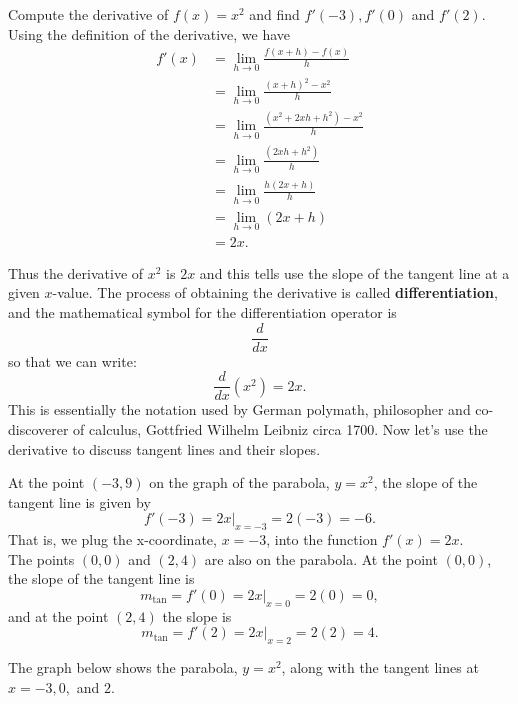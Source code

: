 \documentclass{ximera}
\begin{document}
\begin{example}[example 1]
Compute the derivative of $f(x) = x^2$ and find $f'(-3), f'(0)$ and $f'(2)$.
Using the definition of the derivative, we have
\begin{align*}
f'(x) &= \lim_{h \to 0} \frac{f(x+h)-f(x)}{h}\\[5pt] 
&= \lim_{h \to 0} \frac{(x+h)^2- x^2}{h}\\[5pt] 
&= \lim_{h \to 0} \frac{(x^2 + 2xh + h^2)- x^2}{h} \\[5pt] 
&=  \lim_{h \to 0} \frac{ (2xh + h^2)}{h}\\[5pt] 
&=  \lim_{h \to 0} \frac{ h(2x + h)}{h}\\[5pt] 
&=  \lim_{h \to 0} (2x + h)\\
&= 2x.
\end{align*}

Thus the derivative of $x^2$ is $2x$ and this tells use the slope of the tangent line at a given $x$-value.
The process of obtaining the derivative is called \textbf{differentiation},
and the mathematical symbol for the differentiation operator is
\[
\frac{d}{dx}
\]
so that we can write:
\[
\frac{d}{dx}\left( x^2\right) = 2x.
\]
This is essentially the notation used by German polymath, philosopher and co-discoverer of calculus, 
Gottfried Wilhelm Leibniz circa 1700.
Now let's use the derivative to discuss tangent lines and their slopes.

At the point $(-3, 9)$ on the graph of the parabola, $y = x^2$, the slope of the tangent line is given by 
\[
f'(-3) = 2x\big|_{x=-3} = 2(-3) = -6.
\]
That is, we plug the x-coordinate, $x=-3$, into the function $f'(x) = 2x$.\\
The points $(0,0)$ and $(2,4)$ are also on the parabola. 
At the point $(0,0)$, the slope of the tangent line is 
\[
m_{\text{tan}}= f'(0) =2x\big|_{x=0}= 2(0) = 0,
\]
 and at the point $(2, 4)$ the slope is 
\[
m_{\text{tan}}= f'(2) =2x\big|_{x=2}= 2(2) = 4.
\]

The graph below shows the parabola, $y = x^2$, along with the tangent lines at $x = -3, 0,$ and $2$.


\end{example}
\end{document}
